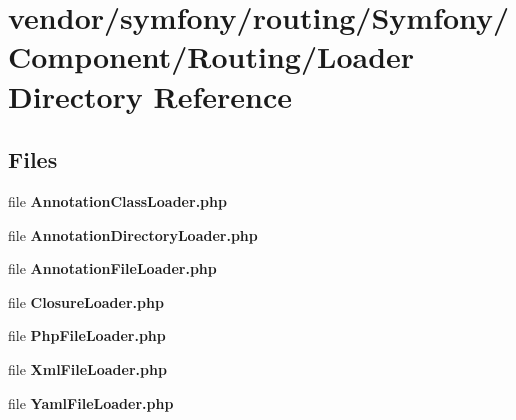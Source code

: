 \section{vendor/symfony/routing/\+Symfony/\+Component/\+Routing/\+Loader Directory Reference}
\label{dir_eaf20b212ddbe1dd70137b149600483a}
\subsection*{Files}
\begin{DoxyCompactItemize}
\item 
file {\bf Annotation\+Class\+Loader.\+php}
\item 
file {\bf Annotation\+Directory\+Loader.\+php}
\item 
file {\bf Annotation\+File\+Loader.\+php}
\item 
file {\bf Closure\+Loader.\+php}
\item 
file {\bf Php\+File\+Loader.\+php}
\item 
file {\bf Xml\+File\+Loader.\+php}
\item 
file {\bf Yaml\+File\+Loader.\+php}
\end{DoxyCompactItemize}
